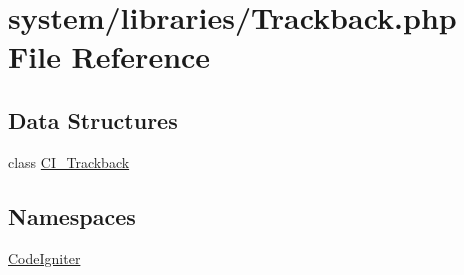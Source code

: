 \hypertarget{_trackback_8php}{\section{system/libraries/\-Trackback.php File Reference}
\label{_trackback_8php}
}
\subsection*{Data Structures}
\begin{DoxyCompactItemize}
\item 
class \hyperlink{class_c_i___trackback}{C\-I\-\_\-\-Trackback}
\end{DoxyCompactItemize}
\subsection*{Namespaces}
\begin{DoxyCompactItemize}
\item 
\hyperlink{namespace_code_igniter}{Code\-Igniter}
\end{DoxyCompactItemize}
